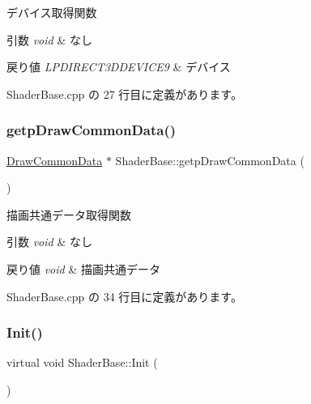 デバイス取得関数 


\begin{DoxyParams}{引数}
{\em void} & なし \\
\hline
\end{DoxyParams}

\begin{DoxyRetVals}{戻り値}
{\em L\+P\+D\+I\+R\+E\+C\+T3\+D\+D\+E\+V\+I\+C\+E9} & デバイス \\
\hline
\end{DoxyRetVals}


 Shader\+Base.\+cpp の 27 行目に定義があります。

\mbox{\label{class_shader_base_a7637faa8fe5aa027dc91e00cfee26f33}} 
\subsubsection{\texorpdfstring{getp\+Draw\+Common\+Data()}{getpDrawCommonData()}}
{\footnotesize\ttfamily \mbox{\hyperlink{class_draw_common_data}{Draw\+Common\+Data}} $\ast$ Shader\+Base\+::getp\+Draw\+Common\+Data (\begin{DoxyParamCaption}{ }\end{DoxyParamCaption})}



描画共通データ取得関数 


\begin{DoxyParams}{引数}
{\em void} & なし \\
\hline
\end{DoxyParams}

\begin{DoxyRetVals}{戻り値}
{\em void} & 描画共通データ \\
\hline
\end{DoxyRetVals}


 Shader\+Base.\+cpp の 34 行目に定義があります。

\mbox{\label{class_shader_base_a9622b2f5e0184a78d3af82820dc5113d}} 
\subsubsection{\texorpdfstring{Init()}{Init()}}
{\footnotesize\ttfamily virtual void Shader\+Base\+::\+Init (\begin{DoxyParamCaption}{ }\end{DoxyParamCaption})\hspace{0.3cm}{\ttfamily [pure virtual]}}




